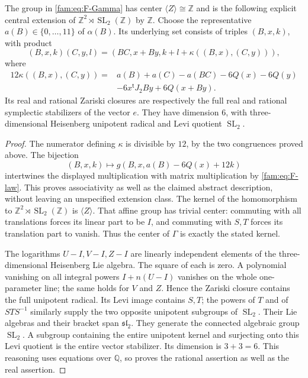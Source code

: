 \begin{proposition}\label{fam:src:F.1.2}\label{fam:st:F.1.2}
The group in \eqref{fam:eq:F-Gamma} has center
$\langle Z\rangle\cong\mathbb Z$ and is the following explicit central
extension of $\mathbb Z^2\rtimes\operatorname{SL}_2(\mathbb Z)$ by
$\mathbb Z$.  Choose the representative $a(B)\in\{0,\ldots,11\}$ of
$\alpha(B)$.  Its underlying set consists of triples $(B,x,k)$, with
product
\[
 (B,x,k)(C,y,l)=(BC,x+By,k+l+\kappa((B,x),(C,y))),
\]
where
\begin{align*}
12\kappa((B,x),(C,y))={}&a(B)+a(C)-a(BC)-6Q(x)-6Q(y)\\
 &-6x^{\mathsf t}J_2By+6Q(x+By).
\end{align*}
Its real and rational Zariski closures are respectively the full real
and rational symplectic stabilizers of the vector $e$.  They have
dimension $6$, with three-dimensional Heisenberg unipotent radical and
Levi quotient $\operatorname{SL}_2$.
\end{proposition}


\begin{proof}
The numerator defining $\kappa$ is divisible by $12$, by the two
congruences proved above.  The bijection
\[
 (B,x,k)\longmapsto g(B,x,a(B)-6Q(x)+12k)
\]
intertwines the displayed multiplication with matrix multiplication by
\eqref{fam:eq:F-law}.  This proves associativity as well as the claimed abstract
description, without leaving an unspecified extension class.  The kernel
of the homomorphism to $\mathbb Z^2\rtimes\operatorname{SL}_2(\mathbb Z)$
is $\langle Z\rangle$.  That affine group has trivial center: commuting
with all translations forces its linear part to be $I$, and commuting
with $S,T$ forces its translation part to vanish.  Thus the center of
$\Gamma$ is exactly the stated kernel.

The logarithms $U-I,V-I,Z-I$ are linearly independent elements of the
three-dimensional Heisenberg Lie algebra.  The square of each is zero.
A polynomial vanishing on all integral powers $I+n(U-I)$ vanishes on
the whole one-parameter line; the same holds for $V$ and $Z$.  Hence the
Zariski closure contains the full unipotent radical.  Its Levi image
contains $S,T$; the powers of $T$ and of $STS^{-1}$ similarly supply the
two opposite unipotent subgroups of $\operatorname{SL}_2$.  Their Lie
algebras and their bracket span $\mathfrak{sl}_2$.  They generate the
connected algebraic group $\operatorname{SL}_2$.  A subgroup containing
the entire unipotent kernel and surjecting onto this Levi quotient is
the entire vector stabilizer.  Its dimension is $3+3=6$.  This reasoning
uses equations over $\mathbb Q$, so proves the rational assertion as
well as the real assertion.
\end{proof}

